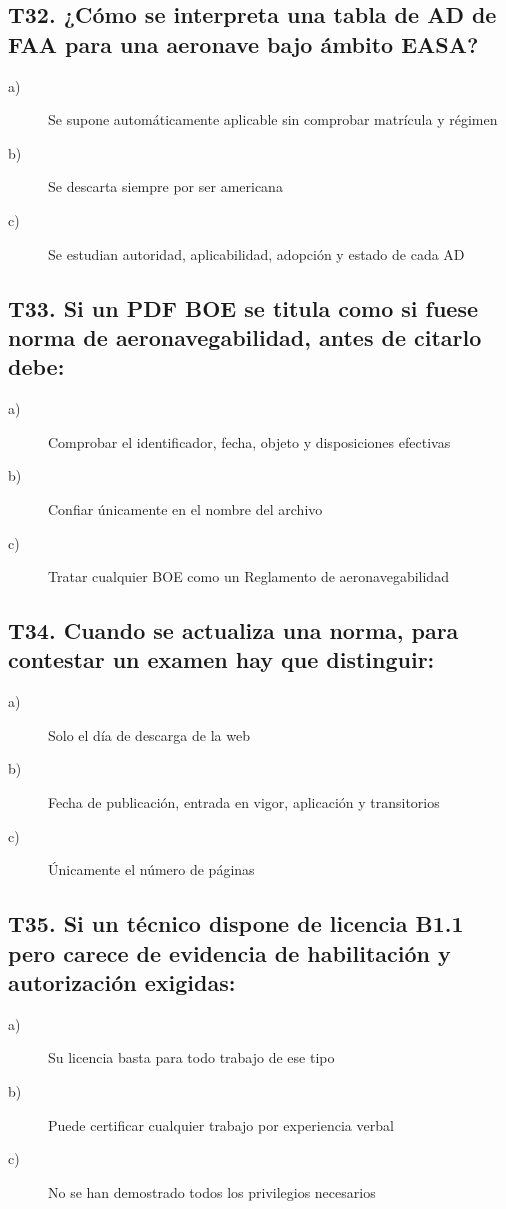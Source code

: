 \subsection*{T32. ¿Cómo se interpreta una tabla de AD de FAA para una aeronave bajo ámbito EASA?}
\begin{description}
\item[a)] Se supone automáticamente aplicable sin comprobar matrícula y régimen
\item[b)] Se descarta siempre por ser americana
\item[c)] Se estudian autoridad, aplicabilidad, adopción y estado de cada AD
\end{description}

\subsection*{T33. Si un PDF BOE se titula como si fuese norma de aeronavegabilidad, antes de citarlo debe:}
\begin{description}
\item[a)] Comprobar el identificador, fecha, objeto y disposiciones efectivas
\item[b)] Confiar únicamente en el nombre del archivo
\item[c)] Tratar cualquier BOE como un Reglamento de aeronavegabilidad
\end{description}

\subsection*{T34. Cuando se actualiza una norma, para contestar un examen hay que distinguir:}
\begin{description}
\item[a)] Solo el día de descarga de la web
\item[b)] Fecha de publicación, entrada en vigor, aplicación y transitorios
\item[c)] Únicamente el número de páginas
\end{description}

\subsection*{T35. Si un técnico dispone de licencia B1.1 pero carece de evidencia de habilitación y autorización exigidas:}
\begin{description}
\item[a)] Su licencia basta para todo trabajo de ese tipo
\item[b)] Puede certificar cualquier trabajo por experiencia verbal
\item[c)] No se han demostrado todos los privilegios necesarios
\end{description}

